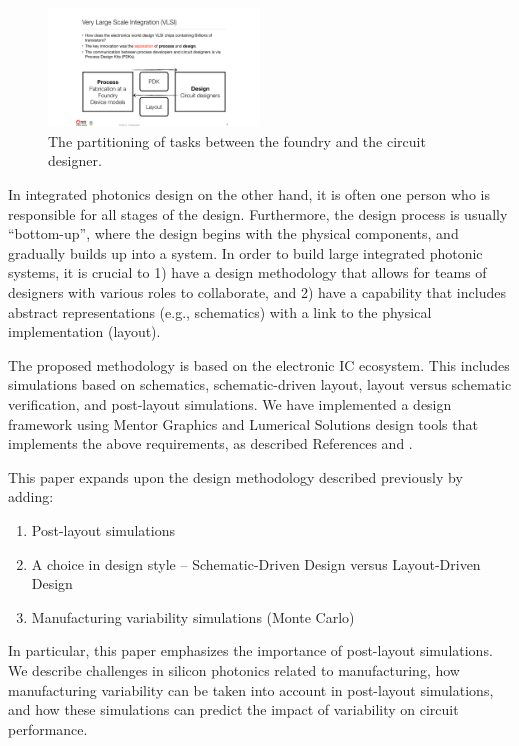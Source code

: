 \documentclass[journal]{spie}
\begin{document}
\begin{figure}[tbp]
	\centering
	\includegraphics[width=0.5\textwidth]{../figs_paper/Process_Design.pdf}
    \caption[]{The partitioning of tasks between the foundry and the circuit designer.}
    \label{Process_Design}
\end{figure}



In integrated photonics design on the other hand, it is often one person who is responsible for all stages of the design.  Furthermore, the design process is usually ``bottom-up'', where the design begins with the physical components, and gradually builds up into a system.   In order to build large integrated photonic systems, it is crucial to 1) have a design methodology that allows for teams of designers with various roles to collaborate, and 2) have a capability that includes abstract representations (e.g., schematics) with a link to the physical implementation (layout).  

The proposed methodology is based on the electronic IC ecosystem.  This includes simulations based on schematics, schematic-driven layout, layout versus schematic verification, and post-layout simulations.   We have implemented a design framework using Mentor Graphics and Lumerical Solutions design tools that implements the above requirements, as described References  and .

This paper expands upon the design methodology described previously by adding:
\begin{enumerate} 
\item Post-layout simulations
\item A choice in design style -- Schematic-Driven Design versus Layout-Driven Design
\item Manufacturing variability simulations (Monte Carlo)
\end{enumerate}
In particular, this paper emphasizes the importance of post-layout simulations.  We describe challenges in silicon photonics related to manufacturing, how manufacturing variability can be taken into account in post-layout simulations, and how these simulations can predict the impact of variability on circuit performance.
\end{document}

